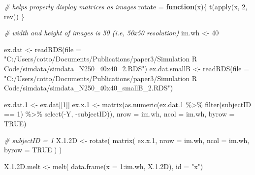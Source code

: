 \documentclass[
]{article}
\newenvironment{Shaded}{\begin{snugshade}}{\end{snugshade}}
\newcommand{\AttributeTok}[1]{\textcolor[rgb]{0.77,0.63,0.00}{#1}}
\newcommand{\CommentTok}[1]{\textcolor[rgb]{0.56,0.35,0.01}{\textit{#1}}}
\newcommand{\ConstantTok}[1]{\textcolor[rgb]{0.00,0.00,0.00}{#1}}
\newcommand{\ControlFlowTok}[1]{\textcolor[rgb]{0.13,0.29,0.53}{\textbf{#1}}}
\newcommand{\DecValTok}[1]{\textcolor[rgb]{0.00,0.00,0.81}{#1}}
\newcommand{\FloatTok}[1]{\textcolor[rgb]{0.00,0.00,0.81}{#1}}
\newcommand{\FunctionTok}[1]{\textcolor[rgb]{0.00,0.00,0.00}{#1}}
\newcommand{\NormalTok}[1]{#1}
\newcommand{\OtherTok}[1]{\textcolor[rgb]{0.56,0.35,0.01}{#1}}
\newcommand{\SpecialCharTok}[1]{\textcolor[rgb]{0.00,0.00,0.00}{#1}}
\newcommand{\StringTok}[1]{\textcolor[rgb]{0.31,0.60,0.02}{#1}}
\begin{document}
\begin{Shaded}
\begin{Highlighting}[]
\CommentTok{\# helps properly display matrices as images}
\NormalTok{rotate }\OtherTok{=} \ControlFlowTok{function}\NormalTok{(x)\{}
    \FunctionTok{t}\NormalTok{(}\FunctionTok{apply}\NormalTok{(x, }\DecValTok{2}\NormalTok{, rev))}
\NormalTok{\}}

\CommentTok{\# width and height of images is 50 (i.e, 50x50 resolution)}
\NormalTok{im.wh }\OtherTok{\textless{}{-}} \DecValTok{40}

\NormalTok{ex.dat }\OtherTok{\textless{}{-}} \FunctionTok{readRDS}\NormalTok{(}\AttributeTok{file =} \StringTok{"C:/Users/cotto/Documents/Publications/paper3/Simulation R Code/simdata/simdata\_N250\_40x40\_2.RDS"}\NormalTok{)}
\NormalTok{ex.dat.smallB }\OtherTok{\textless{}{-}} \FunctionTok{readRDS}\NormalTok{(}\AttributeTok{file =} \StringTok{"C:/Users/cotto/Documents/Publications/paper3/Simulation R Code/simdata/simdata\_N250\_40x40\_smallB\_2.RDS"}\NormalTok{)}

\NormalTok{ex.dat}\FloatTok{.1} \OtherTok{\textless{}{-}}\NormalTok{ ex.dat[[}\DecValTok{1}\NormalTok{]]}
\NormalTok{ex.x}\FloatTok{.1} \OtherTok{\textless{}{-}} \FunctionTok{matrix}\NormalTok{(}\FunctionTok{as.numeric}\NormalTok{(ex.dat}\FloatTok{.1} \SpecialCharTok{\%\textgreater{}\%} 
                              \FunctionTok{filter}\NormalTok{(subjectID }\SpecialCharTok{==} \DecValTok{1}\NormalTok{) }\SpecialCharTok{\%\textgreater{}\%} 
                              \FunctionTok{select}\NormalTok{(}\SpecialCharTok{{-}}\NormalTok{Y, }\SpecialCharTok{{-}}\NormalTok{subjectID)),}
                 \AttributeTok{nrow =}\NormalTok{ im.wh, }\AttributeTok{ncol =}\NormalTok{ im.wh, }\AttributeTok{byrow =} \ConstantTok{TRUE}\NormalTok{)}

\CommentTok{\# subjectID = 1}
\NormalTok{X.}\FloatTok{1.2}\NormalTok{D }\OtherTok{\textless{}{-}} \FunctionTok{rotate}\NormalTok{(}
  \FunctionTok{matrix}\NormalTok{(}
\NormalTok{    ex.x}\FloatTok{.1}\NormalTok{, }
    \AttributeTok{nrow =}\NormalTok{ im.wh, }\AttributeTok{ncol =}\NormalTok{ im.wh, }
    \AttributeTok{byrow =} \ConstantTok{TRUE}
\NormalTok{    )}
\NormalTok{  )}


\NormalTok{X.}\FloatTok{1.2}\NormalTok{D.melt }\OtherTok{\textless{}{-}} \FunctionTok{melt}\NormalTok{(}
  \FunctionTok{data.frame}\NormalTok{(}\AttributeTok{x =} \DecValTok{1}\SpecialCharTok{:}\NormalTok{im.wh, X.}\FloatTok{1.2}\NormalTok{D), }
  \AttributeTok{id =} \StringTok{"x"}\NormalTok{)}
\end{Highlighting}
\end{Shaded}
\end{document}
